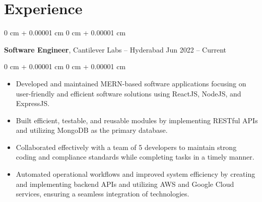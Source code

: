 \documentclass[10pt, letterpaper]{article}
\newenvironment{highlights}{
    \begin{itemize}[
        topsep=0.10 cm,
        parsep=0.10 cm,
        partopsep=0pt,
        itemsep=0pt,
        leftmargin=0 cm + 10pt
    ]
}{
    \end{itemize}
} %
\newenvironment{highlightsforbulletentries}{
    \begin{itemize}[
        topsep=0.10 cm,
        parsep=0.10 cm,
        partopsep=0pt,
        itemsep=0pt,
        leftmargin=10pt
    ]
}{
    \end{itemize}
} %
\newenvironment{onecolentry}{
    \begin{adjustwidth}{
        0 cm + 0.00001 cm
    }{
        0 cm + 0.00001 cm
    }
}{
    \end{adjustwidth}
} %
\newenvironment{twocolentry}[2][]{
    \onecolentry
    \def\secondColumn{#2}
    \setcolumnwidth{\fill, 4.5 cm}
    \begin{paracol}{2}
}{
    \switchcolumn \raggedleft \secondColumn
    \end{paracol}
    \endonecolentry
} %
\begin{document}
    








    \section{Experience}



        
        \begin{twocolentry}{
            Jun 2022 – Current
        }
            \textbf{Software Engineer}, Cantilever Labs -- Hyderabad\end{twocolentry}

        \vspace{0.10 cm}
        \begin{onecolentry}
            \begin{highlights}
\item Developed and maintained MERN-based software applications focusing on user-friendly and efficient software solutions using ReactJS, NodeJS, and ExpressJS.  
\item Built efficient, testable, and reusable modules by implementing RESTful APIs and utilizing MongoDB as the primary database.  
\item Collaborated effectively with a team of 5 developers to maintain strong coding and compliance standards while completing tasks in a timely manner.  
\item Automated operational workflows and improved system efficiency by creating and implementing backend APIs and utilizing AWS and Google Cloud services, ensuring a seamless integration of technologies.
            \end{highlights}
        \end{onecolentry}
\end{document}
